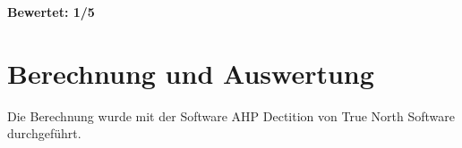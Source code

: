 \textbf{Bewertet: 1/5}

\section{Berechnung und Auswertung}
Die Berechnung wurde mit der Software AHP Dectition von True North Software durchgeführt. 





